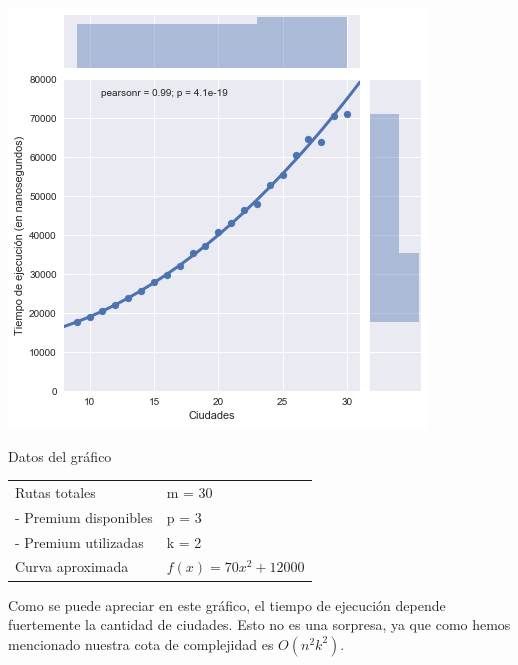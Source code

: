 \noindent
\begin{minipage}{0.55\textwidth}
	\hfill
	\includegraphics[scale=0.65]{imagenes/ej1-1.png}
\end{minipage}
\hfill
\begin{minipage}{0.42\textwidth}
	\begin{center}
		Datos del gráfico

		\begin{tabular}{ | l l |}
			\hline
			Rutas totales & m = 30 \\
			- Premium disponibles & p = 3 \\
			- Premium utilizadas & k = 2 \\ \hline
			Curva aproximada & $f(x) = 70 x^2 + 12000$ \\
			\hline
		\end{tabular}
	\end{center}
\end{minipage}

Como se puede apreciar en este gráfico, el tiempo de ejecución depende fuertemente la cantidad de ciudades. Esto no es una sorpresa, ya que como hemos mencionado nuestra cota de complejidad es $O(n^2k^2)$.

